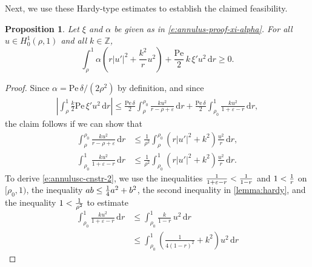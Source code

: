 \documentclass[a4paper, 10pt]{amsart}
\numberwithin{equation}{section}
\theoremstyle{plain}
\newtheorem{proposition}[theorem]{Proposition}
\theoremstyle{definition}
\theoremstyle{remark}
\newcommand{\Z}{\mathbb{Z}}
\newcommand{\Pe}{\mathrm{Pe}}
\newcommand{\abs}[1]{\left\vert #1 \right\vert}
\newcommand{\dr}{\mathrm{d} r}
\begin{document}
Next, we use these Hardy-type estimates to establish the claimed feasibility.

\begin{proposition}\label{prop:annulus-feasibility}
    Let $\xi$ and $\alpha$ be given as in \cref{e:annulus-proof-xi-alpha}. For all $u\in H^1_0(\rho,1)$ and all $k \in \Z$,
    \begin{equation*}
        \int_\rho^1 
        \alpha \left(r\abs{u'}^2+ \frac{k^2}{r}u^2 \right)
        + \frac{\Pe}2 \,k\, \xi' u^2 \, \dr \geq 0.
    \end{equation*}
\end{proposition}

\begin{proof}
    Since $\alpha= \Pe\,\delta / (2\rho^2)$ by definition, and since
    \begin{align*}
        \left|\int_{\rho}^{1}\frac{k}{2}\Pe\, \xi'u^{2}\,\dr\right| 
        \leq
        \frac{\Pe\, \delta}{2} \int_{\rho}^{\rho_0}\frac{ku^{2}}{r-\rho+\varepsilon}\,\dr
        +\frac{\Pe \,\delta}{2}
        \int_{\rho_0}^{1}\frac{ku^{2}}{1+\varepsilon-r}\,\dr,
    \end{align*}
    the claim follows if we can show that
    \begin{subequations}
        \begin{align}
        \label{e:annulusc-cnstr-1}
        \int_{\rho}^{\rho_0}\frac{ku^{2}}{r-\rho+\varepsilon}\,\dr 
        &\leq 
        \frac{1}{\rho^{2}} \int_{\rho}^{\rho_0}\left(r\abs{u'}^{2}+k^{2}\right)\frac{u^{2}}{r}\,\dr,
        \\
        \label{e:annulusc-cnstr-2}
        \int_{\rho_0}^{1}
        \frac{ku^{2}}{1+\varepsilon-r}\,\dr 
        &\leq 
        \frac{1}{\rho^{2}} \int_{\rho_0}^{1}
        \left(r\abs{u'}^{2}+k^{2}\right)\frac{u^{2}}{r}\,\dr.
    \end{align}
    \end{subequations}
    To derive \cref{e:annulusc-cnstr-2}, we use the inequalities $\smash{\frac{1}{1+\varepsilon - r}}< \smash{\frac{1}{1-r}}$ and $1 < \smash{\frac1r}$ on $[\rho_0,1)$, the inequality $ab \leq \smash{\frac14}a^2+b^2$, the second inequality in \cref{lemma:hardy}, and the inequality $1<\smash{\frac{1}{\rho^2}}$ to estimate
    \begin{align*}
        \int_{\rho_0}^1 
        \frac{ku^{2}}{1+\varepsilon-r}\,\dr 
        &\leq 
        \int_{\rho_0}^1\frac{k}{1-r}\,u^{2}\,\dr
        \\
        &\leq
        \int_{\rho_0}^1 
        \left(\frac{1}{4(1-r)^{2}}+k^{2}\right)u^{2}\,\dr

\end{align*}
\end{proof}
\end{document}
